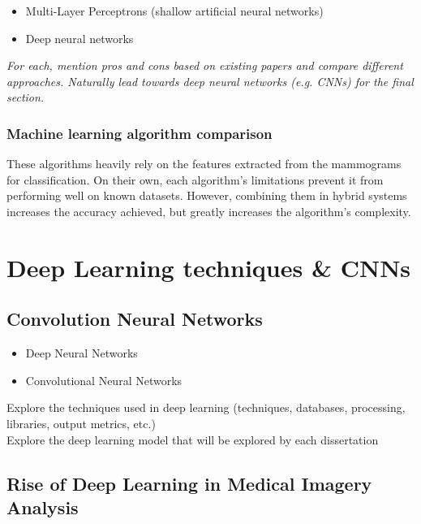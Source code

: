 \begin{itemize}
    \item Multi-Layer Perceptrons (shallow artificial neural networks)
    \item Deep neural networks
\end{itemize}

\textit{For each, mention pros and cons based on existing papers and compare different approaches. Naturally lead towards deep neural networks (e.g. CNNs) for the final section.}

\subsubsection{Machine learning algorithm comparison}

These algorithms heavily rely on the features extracted from the mammograms for classification. On their own, each algorithm's limitations prevent it from performing well on known datasets. However, combining them in hybrid systems increases the accuracy achieved, but greatly increases the algorithm's complexity.


\section{Deep Learning techniques \& CNNs}
\label{sec:litsurvey-DLtechniques-CNN}

\subsection{Convolution Neural Networks}

\begin{itemize}
    \item Deep Neural Networks
    \item Convolutional Neural Networks
\end{itemize}

Explore the techniques used in deep learning (techniques, databases, processing, libraries, output metrics, etc.)\\
Explore the deep learning model that will be explored by each dissertation

\subsection{Rise of Deep Learning in Medical Imagery Analysis}

